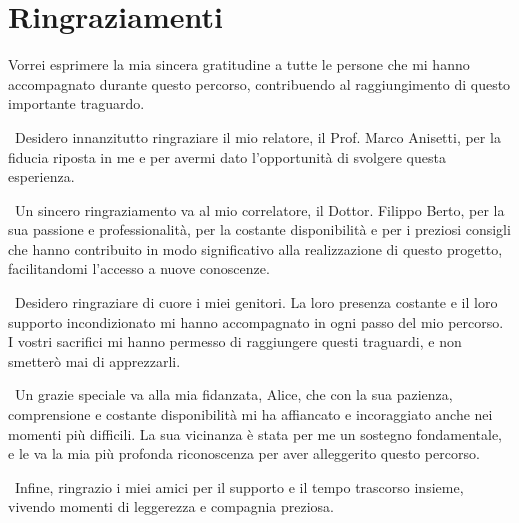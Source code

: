 \chapter*{Ringraziamenti}
Vorrei esprimere la mia sincera gratitudine a tutte le persone che mi hanno accompagnato durante questo percorso, contribuendo al raggiungimento di questo importante traguardo.

\
Desidero innanzitutto ringraziare il mio relatore, il Prof. Marco Anisetti, per la fiducia riposta in me e per avermi dato l'opportunità di svolgere questa esperienza.

\
Un sincero ringraziamento va al mio correlatore, il Dottor. Filippo Berto, 
per la sua passione e professionalità, per la costante disponibilità e per i preziosi consigli che hanno contribuito in modo significativo alla realizzazione di questo progetto, facilitandomi l'accesso a nuove conoscenze.

\
Desidero ringraziare di cuore i miei genitori. La loro presenza costante e il loro supporto incondizionato mi hanno accompagnato in ogni passo del mio percorso. I vostri sacrifici mi hanno permesso di raggiungere questi traguardi, e non smetterò mai di apprezzarli.

\
Un grazie speciale va alla mia fidanzata, Alice, che con la sua pazienza, comprensione e costante disponibilità mi ha affiancato e incoraggiato anche nei momenti più difficili. 
La sua vicinanza è stata per me un sostegno fondamentale, e le va la mia più profonda riconoscenza per aver alleggerito questo percorso.

\
Infine, ringrazio i miei amici per il supporto e il tempo trascorso insieme, vivendo momenti di leggerezza e compagnia preziosa.
